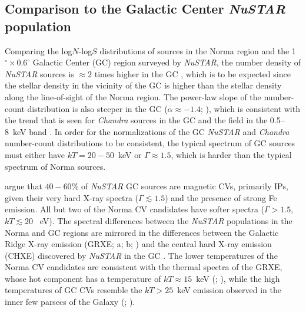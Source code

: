 \documentclass[iop,revtex4]{emulateapj}
\begin{document}
\subsection{Comparison to the Galactic Center \textit{NuSTAR} population}
Comparing the log$N$-log$S$ distributions of sources in the Norma region and the 1$^{\circ}\times0.6^{\circ}$ Galactic Center (GC) region surveyed by \textit{NuSTAR}, the number density of \textit{NuSTAR} sources is $\approx2$ times higher in the GC \citep{hong16}, which is to be expected since the stellar density in the vicinity of the GC is higher than the stellar density along the line-of-sight of the Norma region.  The power-law slope of the number-count distribution is also steeper in the GC ($\alpha\approx-1.4$; \citealt{hong16}), which is consistent with the trend that is seen for \textit{Chandra} sources in the GC and the field in the 0.5--8~keV band \citep{muno09}.  In order for the normalizations of the GC \textit{NuSTAR} and \textit{Chandra} number-count distributions to be consistent, the typical spectrum of GC sources must either have $kT=20-50$~keV or $\Gamma\approx1.5$, which is harder than the typical spectrum of Norma sources.  \par
\citet{hong16} argue that $40-60$\% of \textit{NuSTAR} GC sources are magnetic CVs, primarily IPs, given their very hard X-ray spectra ($\Gamma\lesssim1.5$) and the presence of strong Fe emission.  All but two of the Norma CV candidates have softer spectra ($\Gamma>1.5$, $kT\lesssim20$ ~eV).  The spectral differences between the \textit{NuSTAR} populations in the Norma and GC regions are mirrored in the differences between the Galactic Ridge X-ray emission (GRXE; \citealt{revnivtsev06a}a; \citealt{revnivtsev06b}b; \citealt{revnivtsev09}) and the central hard X-ray emission (CHXE) discovered by \textit{NuSTAR} in the GC \citep{perez15}. The lower temperatures of the Norma CV candidates are consistent with the thermal spectra of the GRXE, whose hot component has a temperature of $kT\approx15$~keV (\citealt{turler10}; \citealt{yuasa12}), while the high temperatures of GC CVs resemble the $kT>25$~keV emission observed in the inner few parsecs of the Galaxy (\citealt{perez15}; \citealt{hong16}).  \par
\end{document}
